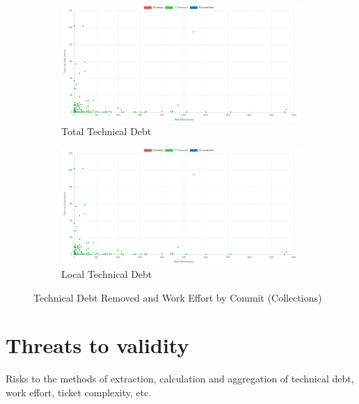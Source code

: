 \documentclass{mpaper}
\begin{document}
\begin{figure}[htp]
	\centering
	\begin{subfigure}{.45\textwidth}
		\includegraphics[width=\linewidth]{images/collections_removed_debt_commit.png}
		\caption{Total Technical Debt}
		\label{fig:collections-td-timeline}
	\end{subfigure}
	\begin{subfigure}{.45\textwidth}
		\includegraphics[width=\linewidth]{images/collections_removed_debt_commit.png}
		\caption{Local Technical Debt}
		\label{fig:spring-td-timeline}
	\end{subfigure}
	\caption{Technical Debt Removed and Work Effort by Commit (Collections)}
	\label{fig:td-timeline}
\end{figure}

\section{Threats to validity}
\label{validity}

Risks to the methods of extraction, calculation and aggregation of technical
debt, work effort, ticket complexity, etc.
\end{document}
